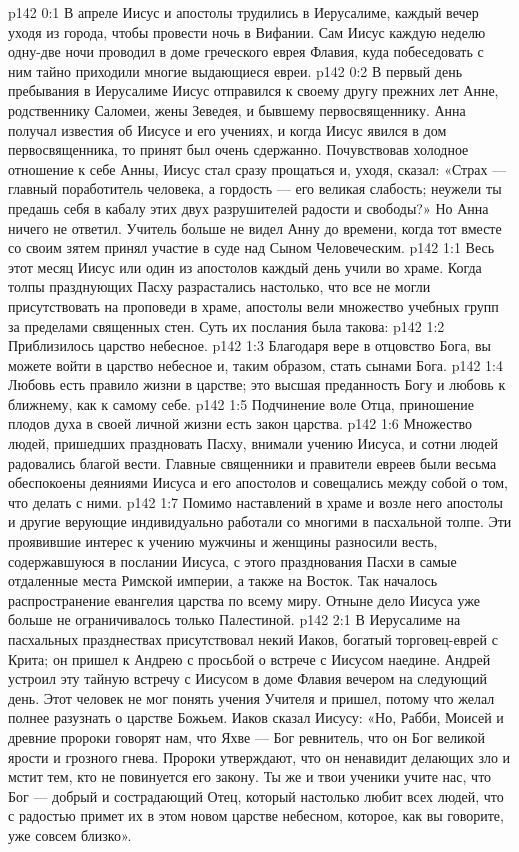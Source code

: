\author{Комиссия срединников}
\vs p142 0:1 В апреле Иисус и апостолы трудились в Иерусалиме, каждый вечер уходя из города, чтобы провести ночь в Вифании. Сам Иисус каждую неделю одну\hyp{}две ночи проводил в доме греческого еврея Флавия, куда побеседовать с ним тайно приходили многие выдающиеся евреи.
\vs p142 0:2 \pc В первый день пребывания в Иерусалиме Иисус отправился к своему другу прежних лет Анне, родственнику Саломеи, жены Зеведея, и бывшему первосвященнику. Анна получал известия об Иисусе и его учениях, и когда Иисус явился в дом первосвященника, то принят был очень сдержанно. Почувствовав холодное отношение к себе Анны, Иисус стал сразу прощаться и, уходя, сказал: «Страх --- главный поработитель человека, а гордость --- его великая слабость; неужели ты предашь себя в кабалу этих двух разрушителей радости и свободы?» Но Анна ничего не ответил. Учитель больше не видел Анну до времени, когда тот вместе со своим зятем принял участие в суде над Сыном Человеческим.
\vs p142 1:1 Весь этот месяц Иисус или один из апостолов каждый день учили во храме. Когда толпы празднующих Пасху разрастались настолько, что все не могли присутствовать на проповеди в храме, апостолы вели множество учебных групп за пределами священных стен. Суть их послания была такова:
\vs p142 1:2 \bibnobreakspace Приблизилось царство небесное.
\vs p142 1:3 \bibnobreakspace Благодаря вере в отцовство Бога, вы можете войти в царство небесное и, таким образом, стать сынами Бога.
\vs p142 1:4 \bibnobreakspace Любовь есть правило жизни в царстве; это высшая преданность Богу и любовь к ближнему, как к самому себе.
\vs p142 1:5 \bibnobreakspace Подчинение воле Отца, приношение плодов духа в своей личной жизни есть закон царства.
\vs p142 1:6 \pc Множество людей, пришедших праздновать Пасху, внимали учению Иисуса, и сотни людей радовались благой вести. Главные священники и правители евреев были весьма обеспокоены деяниями Иисуса и его апостолов и совещались между собой о том, что делать с ними.
\vs p142 1:7 Помимо наставлений в храме и возле него апостолы и другие верующие индивидуально работали со многими в пасхальной толпе. Эти проявившие интерес к учению мужчины и женщины разносили весть, содержавшуюся в послании Иисуса, с этого празднования Пасхи в самые отдаленные места Римской империи, а также на Восток. Так началось распространение евангелия царства по всему миру. Отныне дело Иисуса уже больше не ограничивалось только Палестиной.
\vs p142 2:1 В Иерусалиме на пасхальных празднествах присутствовал некий Иаков, богатый торговец\hyp{}еврей с Крита; он пришел к Андрею с просьбой о встрече с Иисусом наедине. Андрей устроил эту тайную встречу с Иисусом в доме Флавия вечером на следующий день. Этот человек не мог понять учения Учителя и пришел, потому что желал полнее разузнать о царстве Божьем. Иаков сказал Иисусу: «Но, Рабби, Моисей и древние пророки говорят нам, что Яхве --- Бог ревнитель, что он Бог великой ярости и грозного гнева. Пророки утверждают, что он ненавидит делающих зло и мстит тем, кто не повинуется его закону. Ты же и твои ученики учите нас, что Бог --- добрый и сострадающий Отец, который настолько любит всех людей, что с радостью примет их в этом новом царстве небесном, которое, как вы говорите, уже совсем близко».
